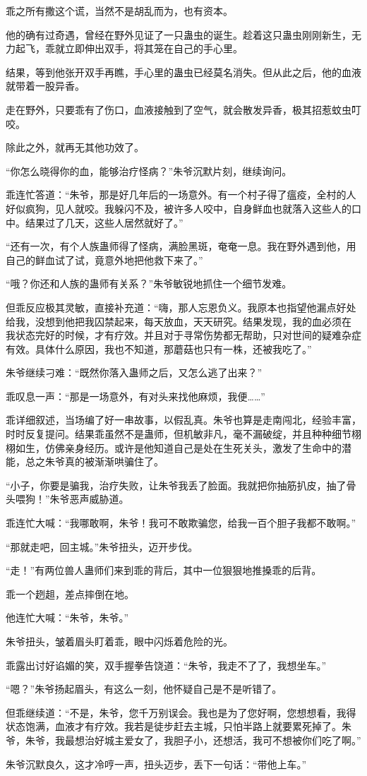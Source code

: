 \begin{this_body}
乖之所有撒这个谎，当然不是胡乱而为，也有资本。

他的确有过奇遇，曾经在野外见证了一只蛊虫的诞生。趁着这只蛊虫刚刚新生，无力起飞，乖就立即伸出双手，将其笼在自己的手心里。

结果，等到他张开双手再瞧，手心里的蛊虫已经莫名消失。但从此之后，他的血液就带着一股异香。

走在野外，只要乖有了伤口，血液接触到了空气，就会散发异香，极其招惹蚊虫叮咬。

除此之外，就再无其他功效了。

“你怎么晓得你的血，能够治疗怪病？”朱爷沉默片刻，继续询问。

乖连忙答道：“朱爷，那是好几年后的一场意外。有一个村子得了瘟疫，全村的人好似疯狗，见人就咬。我躲闪不及，被许多人咬中，自身鲜血也就落入这些人的口中。结果过了几天，这些人居然就好了。”

“还有一次，有个人族蛊师得了怪病，满脸黑斑，奄奄一息。我在野外遇到他，用自己的鲜血试了试，竟意外地把他救下来了。”

“哦？你还和人族的蛊师有关系？”朱爷敏锐地抓住一个细节发难。

但乖反应极其灵敏，直接补充道：“嗨，那人忘恩负义。我原本也指望他漏点好处给我，没想到他把我囚禁起来，每天放血，天天研究。结果发现，我的血必须在 我状态完好的时候，才有疗效。并且对于寻常伤势都无帮助，只对世间的疑难杂症有效。具体什么原因，我也不知道，那蘑菇也只有一株，还被我吃了。”

朱爷继续刁难：“既然你落入蛊师之后，又怎么逃了出来？”

乖叹息一声：“那是一场意外，有对头来找他麻烦，我便……”

乖详细叙述，当场编了好一串故事，以假乱真。朱爷也算是走南闯北，经验丰富，时时反复提问。结果乖虽然不是蛊师，但机敏非凡，毫不漏破绽，并且种种细节栩栩如生，仿佛亲身经历。或许是他知道自己是处在生死关头，激发了生命中的潜能，总之朱爷真的被渐渐哄骗住了。

“小子，你要是骗我，治疗失败，让朱爷我丢了脸面。我就把你抽筋扒皮，抽了骨头喂狗！”朱爷恶声威胁道。

乖连忙大喊：“我哪敢啊，朱爷！我可不敢欺骗您，给我一百个胆子我都不敢啊。”

“那就走吧，回主城。”朱爷扭头，迈开步伐。

“走！”有两位兽人蛊师们来到乖的背后，其中一位狠狠地推搡乖的后背。

乖一个趔趄，差点摔倒在地。

他连忙大喊：“朱爷，朱爷。”

朱爷扭头，皱着眉头盯着乖，眼中闪烁着危险的光。

乖露出讨好谄媚的笑，双手握拳告饶道：“朱爷，我走不了了，我想坐车。”

“嗯？”朱爷扬起眉头，有这么一刻，他怀疑自己是不是听错了。

但乖继续道：“不是，朱爷，您千万别误会。我也是为了您好啊，您想想看，我得状态饱满，血液才有疗效。我若是徒步赶去主城，只怕半路上就要累死掉了。朱爷，朱爷，我最想治好城主爱女了，我胆子小，还想活，我可不想被你们吃了啊。”

朱爷沉默良久，这才冷哼一声，扭头迈步，丢下一句话：“带他上车。”

\end{this_body}

